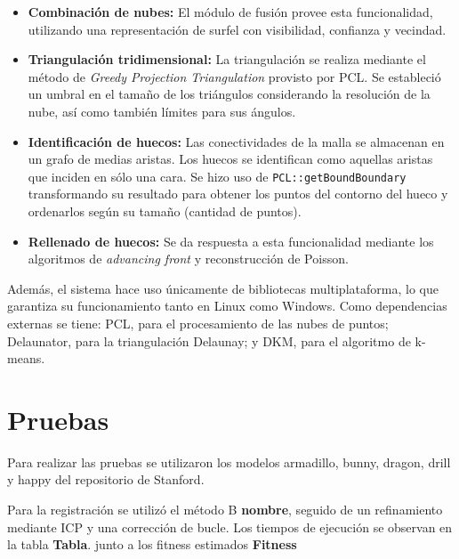 \documentclass{pfc}
\newcommand{\Alerta}[1]{{\Huge\bfseries\sffamily#1}}
\newcommand{\NombreItem}[1]{{\bfseries#1:}}
\begin{document}
\begin{itemize}
			\item  \NombreItem{Combinación de nubes}
				El módulo de fusión provee esta funcionalidad, utilizando una
				representación de surfel con visibilidad, confianza y vecindad.

			\item  \NombreItem{Triangulación tridimensional}
				La triangulación se realiza mediante el método de \emph{Greedy
				Projection Triangulation} provisto por PCL. %
				Se estableció un umbral en el tamaño de los triángulos considerando la resolución de la nube,
				así como también límites para sus ángulos.

			\item  \NombreItem{Identificación de huecos}
				Las conectividades de la malla se almacenan en un grafo de medias aristas.
				Los huecos se identifican como aquellas aristas que inciden en sólo una cara.
				Se hizo uso de \texttt{PCL::getBoundBoundary} transformando su resultado para
				obtener los puntos del contorno del hueco y ordenarlos según su tamaño
				(cantidad de puntos).

			\item  \NombreItem{Rellenado de huecos}
				Se da respuesta a esta funcionalidad mediante los algoritmos de \emph{advancing front} y reconstrucción de Poisson.
		\end{itemize}


		Además, el sistema hace uso únicamente de bibliotecas multiplataforma, lo que garantiza su funcionamiento tanto en Linux como Windows.
		Como dependencias externas se tiene: %
		PCL, para el procesamiento de las nubes de puntos;
		Delaunator, para la triangulación Delaunay;
		y DKM, para el algoritmo de k-means.

	\section{Pruebas}
		Para realizar las pruebas se utilizaron los modelos
			armadillo,
			bunny,
			dragon,
			drill y
			happy del repositorio de Stanford. %

		Para la registración se utilizó el método B \Alerta{nombre}, seguido de
		un refinamiento mediante ICP y una corrección de bucle.
		Los tiempos de ejecución se observan en la tabla \Alerta{Tabla}.
		junto a los fitness estimados
		\Alerta{Fitness}
\end{document}
